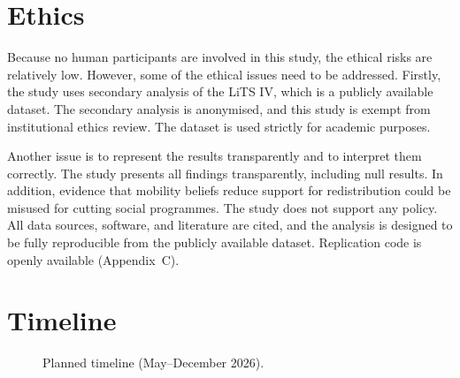 \documentclass[11pt,a4paper]{article}
\begin{document}
\vspace{-6pt}
\section{Ethics}

Because no human participants are involved in this study, the ethical risks are
relatively low. However, some of the ethical issues need to be addressed. Firstly,
the study uses secondary analysis of the LiTS IV, which is a publicly available
dataset. The secondary analysis is anonymised, and this study is exempt from
institutional ethics review. The dataset is used strictly for academic purposes.

Another issue is to represent the results transparently and to interpret them
correctly. The study presents all findings transparently, including null results.
In addition, evidence that mobility beliefs reduce support for
redistribution could be misused for cutting social programmes. The study does not
support any policy. All data sources, software, and literature are cited, and the
analysis is designed to be fully reproducible from the publicly available dataset.
Replication code is openly available (Appendix~C).


\vspace{-6pt}
\section{Timeline}
\vspace{-4pt}

\begin{figure}[H]
\centering
{}
\caption{Planned timeline (May--December 2026).}
\label{fig:gantt}
\end{figure}
\end{document}
